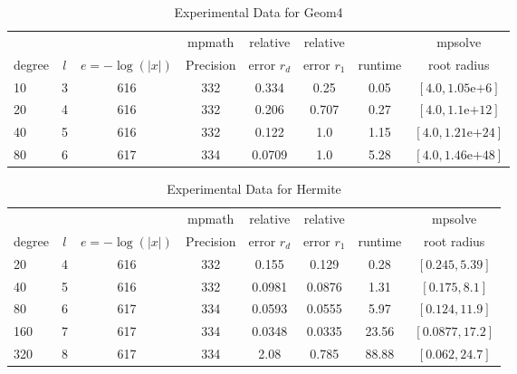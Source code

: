 \documentclass[sigconf]{acmart}
\begin{document}
\begin{table}[t]
\caption{Experimental Data for Geom4}
\label{tab:geom4}
\vskip -0.15in
\begin{center}
\begin{small}
\begin{sc}
\begin{tabular}{lccccccc}
\toprule
&  &  & mpmath & relative  & relative &  & mpsolve \\
degree  & $l$& $e=-\log(|x|)$& Precision &error $r_d$       & error $r_1$ &runtime& root radius\\
\midrule
 10 & 3 & 616 & 332 & 0.334 & 0.25 & 0.05 & $[4.0, 1.05\text{e+}6]$\\
 20 & 4 & 616 & 332 & 0.206 & 0.707 & 0.27 & $[4.0, 1.1\text{e+}12]$\\
 40 & 5 & 616 & 332 & 0.122 & 1.0 & 1.15 & $[4.0, 1.21\text{e+}24]$\\
 80 & 6 & 617 & 334 & 0.0709 & 1.0 & 5.28 & $[4.0, 1.46\text{e+}48]$\\
\bottomrule
\end{tabular}
\end{sc}
\end{small}
\end{center}
\vskip 0.05in
\end{table}

\begin{table}[t]
\caption{Experimental Data for Hermite}
\label{tab:hermite}
\vskip -0.15in
\begin{center}
\begin{small}
\begin{sc}
\begin{tabular}{lccccccc}
\toprule
&  &  & mpmath & relative  & relative &  & mpsolve \\
degree  & $l$& $e=-\log(|x|)$& Precision &error $r_d$       & error $r_1$ &runtime& root radius\\
\midrule
 20 & 4 & 616 & 332 & 0.155 & 0.129 & 0.28 & $[0.245, 5.39]$\\
 40 & 5 & 616 & 332 & 0.0981 & 0.0876 & 1.31 & $[0.175, 8.1]$\\
 80 & 6 & 617 & 334 & 0.0593 & 0.0555 & 5.97 & $[0.124, 11.9]$\\
 160 & 7 & 617 & 334 & 0.0348 & 0.0335 & 23.56 & $[0.0877, 17.2]$\\
 320 & 8 & 617 & 334 & 2.08 & 0.785 & 88.88 & $[0.062, 24.7]$\\
\bottomrule
\end{tabular}
\end{sc}
\end{small}
\end{center}
\vskip 0.05in
\end{table}
\end{document}
